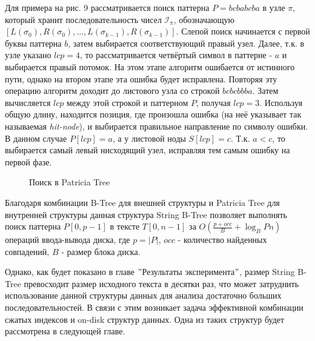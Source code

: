 \documentclass[a4paper,12pt]{article}
\begin{document}
Для примера на рис. 9 \cite{ferragina1999string} рассматривается поиск паттерна $P=bcbabcba$ в узле $\pi$, который хранит последовательность чисел $\mathscr{I}_{\pi}$, обозначающую \newline $[L(\sigma_0), R(\sigma_0),...,L(\sigma_{k-1}), R(\sigma_{k-1})]$. Слепой поиск начинается с первой буквы паттерна $b$, затем выбирается соответствующий правый узел. Далее, т.к. в узле указано $lcp=4$, то рассматривается четвёртый символ в паттерне - $a$ и выбирается правый потомок. На этом этапе алгоритм ошибается от истинного пути, однако на втором этапе эта ошибка будет исправлена. Повторяя эту операцию алгоритм доходит до листового узла со строкой $bcbcbbba$. Затем вычисляется $lcp$ между этой строкой и паттерном $P$, получая $lcp=3$. Используя общую длину, находится позиция, где произошла ошибка (на неё указывает так называемая \textit{hit-node}), и выбирается правильное направление по символу ошибки. В данном случае $P[lcp]=a$, а у листовой ноды $S[lcp]=c$. Т.к. $a < c$, то выбирается самый левый нисходящий узел, исправляя тем самым ошибку на первой фазе\cite{ferragina1999string}.

\begin{figure}[h!]
\caption{Поиск в Patricia Tree}
\end{figure}

Благодаря комбинации B-Tree для внешней структуры и Patricia Tree для внутренней структуры данная структура String B-Tree позволяет выполнять поиск паттерна $P[0, p-1]$ в тексте $T[0, n-1]$ за $O(\frac{p + occ}{B} + \log_BP{n})$ операций ввода-вывода диска, где $p = |P|$, $occ$ - количество найденных совпадений, $B$ - размер блока диска.

Однако, как будет показано в главе $"$Результаты эксперимента$"$, размер String B-Tree превосходит размер исходного текста в десятки раз, что может затруднить использование данной структуры данных для анализа достаточно больших последовательностей. В связи с этим возникает задача эффективной комбинации сжатых индексов и on-disk структур данных. Одна из таких структур будет рассмотрена в следующей главе.
\end{document}
